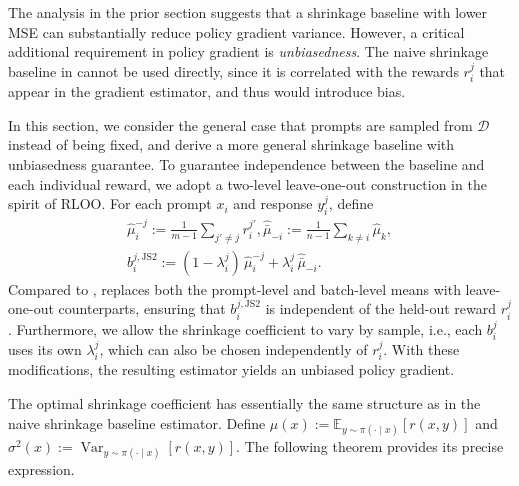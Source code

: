 \documentclass{article}
\theoremstyle{plain}
\theoremstyle{definition}
\theoremstyle{remark}
\newcommand{\cD}{\mathcal{D}}
\newcommand{\E}{\mathbb{E}}
\DeclareMathOperator{\Var}{Var}
\begin{document}
  The analysis in the prior section suggests that a shrinkage baseline with lower MSE can substantially reduce policy gradient variance. However, a critical additional requirement in policy gradient is \emph{unbiasedness}. The naive shrinkage baseline in  cannot be used directly, since it is correlated with the rewards $r_i^j$ that appear in the gradient estimator, and thus would introduce bias. 
  
  In this section, we consider the general case that prompts are sampled from $\cD$ instead of being fixed, and derive a more general shrinkage baseline with unbiasedness guarantee. To guarantee independence between the baseline and each individual reward, we adopt a two-level leave-one-out construction in the spirit of RLOO. For each prompt $x_i$ and response $y_i^j$, define
\begin{gather}
    \textstyle \hat \mu_i^{-j} := \frac{1}{m-1}\sum_{j'\neq j} r_i^{j'}, 
    \textstyle \hat{\bar \mu}_{-i} := \frac{1}{n-1}\sum_{k\neq i}\hat \mu_k, \label{eq:local_loo} \\
    \textstyle b_i^{j,\mathrm{JS2}} := (1-\lambda_i^{j})\,\hat \mu_i^{-j} + \lambda_i^j \,\hat{\bar \mu}_{-i}.
    \label{eq:baseline_unbias}
\end{gather}
  Compared to ,  replaces both the prompt-level and batch-level means with leave-one-out counterparts, ensuring that $b_i^{j,\mathrm{JS2}}$ is independent of the held-out reward $r_i^j$. Furthermore, we allow the shrinkage coefficient to vary by sample, i.e., each $b_i^j$ uses its own $\lambda_i^j$, which can also be chosen independently of $r_i^j$. With these modifications, the resulting estimator yields an unbiased policy gradient. 
  
  The optimal shrinkage coefficient has essentially the same structure as in the naive shrinkage baseline estimator. Define $\mu(x):=\E_{y\sim\pi(\cdot\mid x)}[r(x,y)]$ and
$\sigma^2(x):=\Var_{y\sim\pi(\cdot\mid x)}[r(x,y)]$.
  The following theorem provides its precise expression.
  
\end{document}
